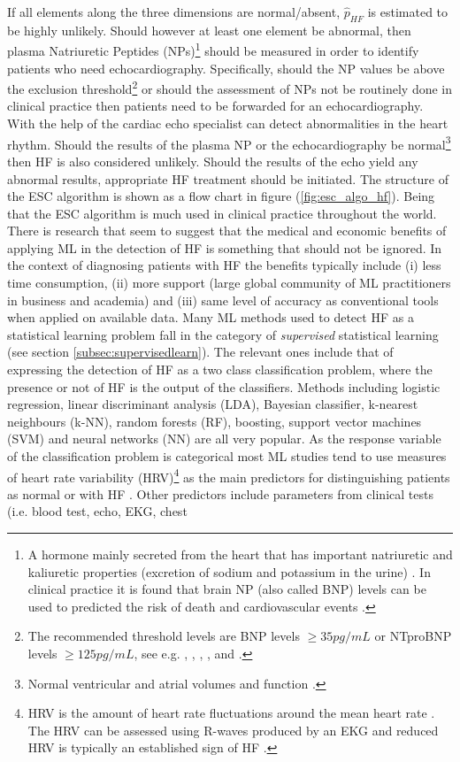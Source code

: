 \documentclass[../thesis.tex]{subfiles}
\begin{document}
\indent If all elements along the three dimensions are normal/absent, $\hat{p}_{HF}$ is estimated to be highly unlikely. Should however at least one element be abnormal, then plasma Natriuretic Peptides (NPs)\footnote{A hormone mainly secreted from the heart that has important natriuretic and kaliuretic properties (excretion of sodium and potassium in the urine) \citep{pandit2011natriuretic}. In clinical practice it is found that brain NP (also called BNP) levels can be used to predicted the risk of death and cardiovascular events  \citep{wang2004plasma}.} should be measured in order to identify patients who need echocardiography. Specifically, should the NP values be above the exclusion threshold\footnote{The recommended threshold levels are BNP levels $\geq 35 pg/mL$ or NTproBNP levels $\geq 125 pg/mL$, see e.g. \cite{cowie1997value}, \cite{yamamoto2000clinical}, \cite{krishnaswamy2001utility}, \cite{zaphiriou2005diagnostic}, \cite{fuat2006diagnostic} and \cite{maisel2008state}.} or should the assessment of NPs not be routinely done in clinical practice then patients need to be forwarded for an echocardiography. With the help of the cardiac echo specialist can detect abnormalities in the heart rhythm. Should the results of the plasma NP or the echocardiography be normal\footnote{Normal ventricular and atrial volumes and function \citep{aune2009normal}.} then HF is also considered unlikely.  Should the results of the echo yield any abnormal results, appropriate HF treatment should be initiated. The structure of the ESC algorithm is shown as a flow chart in figure (\ref{fig:esc_algo_hf}). Being that the ESC algorithm is much used in clinical practice throughout the world. There is research that seem to suggest that the medical and economic benefits of applying ML in the detection of HF is something that should not be ignored. In the context of diagnosing patients with HF the benefits typically include (i) less time consumption, (ii) more support (large global community of ML practitioners in business and academia) and (iii) same level of accuracy as conventional tools when applied on available data. Many ML methods used to detect HF as a statistical learning problem fall in the category of \textit{supervised} statistical learning (see section \ref{subsec:supervisedlearn}). The relevant ones include that of expressing the detection of HF as a two class classification problem, where the presence or not of HF is the output of the classifiers. Methods including logistic regression, linear discriminant analysis (LDA), Bayesian classifier, k-nearest neighbours (k-NN), random forests (RF), boosting, support vector machines (SVM) and neural networks (NN) are all very popular. As the response variable of the classification problem is categorical most ML studies tend to use measures of heart rate variability (HRV)\footnote{HRV is the amount of heart rate fluctuations around the mean heart rate \citep{van1993heart}. The HRV can be assessed using R-waves produced by an EKG and reduced HRV is typically an established sign of HF \citep{ernst2016heart}.} as the main predictors for distinguishing patients as normal or with HF \citep{tripoliti2017heart}. Other predictors include parameters from clinical tests (i.e. blood test, echo, EKG, chest 
\end{document}
